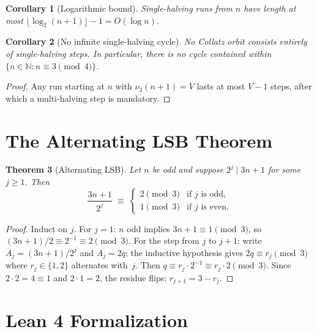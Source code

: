\documentclass[12pt]{article}
\newtheorem{theorem}{Theorem}[section]
\newtheorem{corollary}[theorem]{Corollary}
\newcommand{\vp}{\nu_2}
\begin{document}
\begin{corollary}[Logarithmic bound]\label{cor:log}
Single-halving runs from $n$ have length at most
$\lfloor\log_2(n+1)\rfloor - 1 = O(\log n)$.
\end{corollary}

\begin{corollary}[No infinite single-halving cycle]\label{cor:nocycle}
No Collatz orbit consists entirely of single-halving steps.
In particular, there is no cycle contained within
$\{n\in\mathbb{N} : n\equiv 3\pmod 4\}$.
\end{corollary}

\begin{proof}
Any run starting at $n$ with $\vp(n+1)=V$ lasts at most $V-1$ steps,
after which a multi-halving step is mandatory.
\end{proof}

\section{The Alternating LSB Theorem}

\begin{theorem}[Alternating LSB]\label{thm:lsb}
Let $n$ be odd and suppose $2^j \mid 3n+1$ for some $j\geq 1$.  Then
\[
  \frac{3n+1}{2^j} \;\equiv\;
  \begin{cases}
    2 \pmod 3 & \text{if } j \text{ is odd},\\
    1 \pmod 3 & \text{if } j \text{ is even}.
  \end{cases}
\]
\end{theorem}

\begin{proof}
Induct on $j$.  For $j=1$: $n$ odd implies $3n+1 \equiv 1\pmod 3$,
so $(3n+1)/2 \equiv 2^{-1} \equiv 2\pmod 3$.
For the step from $j$ to $j+1$: write $A_j = (3n+1)/2^j$ and $A_j =
2q$; the inductive hypothesis gives $2q \equiv r_j\pmod 3$ where
$r_j\in\{1,2\}$ alternates with~$j$.  Then $q \equiv r_j\cdot 2^{-1}
\equiv r_j\cdot 2\pmod 3$.  Since $2\cdot 2 = 4\equiv 1$ and
$2\cdot 1 = 2$, the residue flips: $r_{j+1} = 3-r_j$.
\end{proof}

\section{Lean 4 Formalization}
\end{document}
